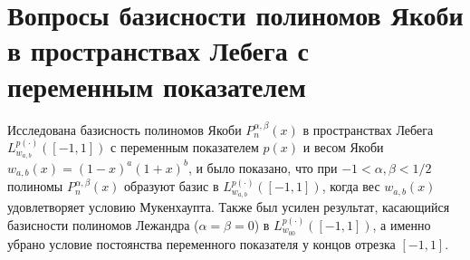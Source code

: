 \chapter{Вопросы базисности полиномов Якоби в пространствах Лебега с переменным показателем}

  Исследована базисность полиномов Якоби $P_n^{\alpha,\beta}(x)$ в пространствах Лебега \linebreak$L^{p(\cdot)}_{w_{a,b}}([-1,1])$ с переменным показателем $p(x)$ и весом Якоби $w_{a,b}(x)=(1-x)^a(1+x)^b$, и было показано, что при $-1<\alpha,\beta<1/2$ полиномы $P_n^{\alpha,\beta}(x)$ образуют базис в $L^{p(\cdot)}_{w_{a,b}}([-1,1])$, когда вес $w_{a,b}(x)$ удовлетворяет условию Мукенхаупта. Также был усилен результат, касающийся базисности полиномов Лежандра ($\alpha=\beta=0$) в $L^{p(\cdot)}_{w_{00}}([-1,1])$, а именно убрано условие постоянства переменного показателя у концов отрезка $[-1,1]$.



%

